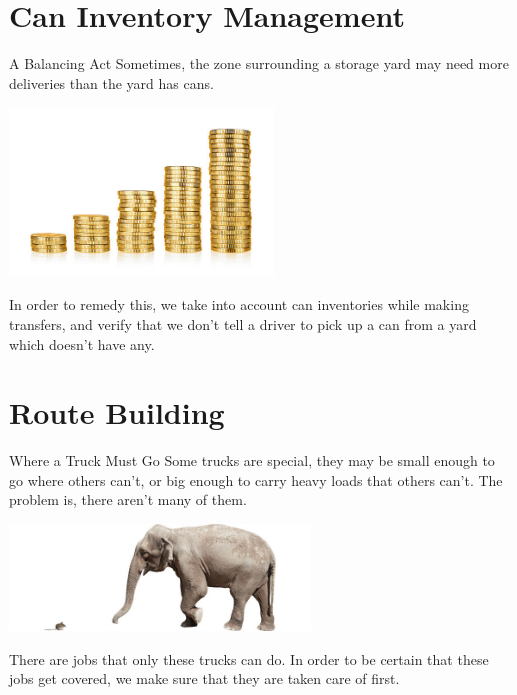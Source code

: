 \documentclass{beamer}
\begin{document}
\section{Can Inventory Management}
\begin{frame}{A Balancing Act}
	Sometimes, the zone surrounding a storage yard may need more deliveries than the yard has cans.
	\begin{center}
		\includegraphics[width=7cm]{coins.jpg}
	\end{center}
	\pause
	In order to remedy this, we take into account can inventories while making transfers, and verify that we don't tell a driver to pick up a can from a yard which doesn't have any.
\end{frame}

\section{Route Building}
\begin{frame}{Where a Truck Must Go}
	Some trucks are special, they may be small enough to go where others can't, or big enough to carry heavy loads that others can't. The problem is, there aren't many of them.
	\vspace{.5cm}
	\begin{center}
		\includegraphics[width=8cm]{mouse_elephant.jpg}
	\end{center}

	\vspace{.5cm}
	\pause
	There are jobs that only these trucks can do. In order to be certain that these jobs get covered, we make sure that they are taken care of first.
\end{frame}
\end{document}
